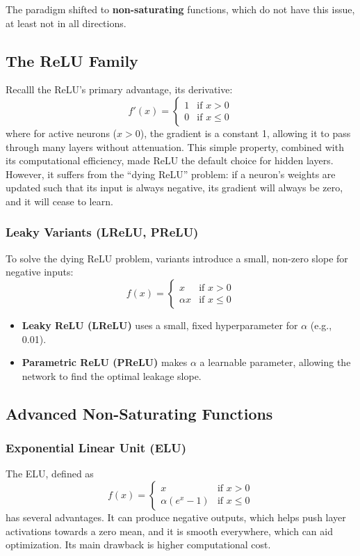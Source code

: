 \documentclass{article}
\begin{document}
The paradigm shifted to \textbf{non-saturating} functions, which do not have this issue, at least not in all directions.

\subsection{The ReLU Family}
Recalll the ReLU's primary advantage, its derivative:
\begin{equation}
f'(x) = 
\begin{cases} 
1 & \text{if } x > 0 \\
0 & \text{if } x \leq 0 
\end{cases}
\end{equation}
where for active neurons ($x>0$), the gradient is a constant 1, allowing it to pass through many layers without attenuation. This simple property, combined with its computational efficiency, made ReLU the default choice for hidden layers. However, it suffers from the ``dying ReLU'' problem: if a neuron's weights are updated such that its input is always negative, its gradient will always be zero, and it will cease to learn.

\subsubsection{Leaky Variants (LReLU, PReLU)}
To solve the dying ReLU problem, variants introduce a small, non-zero slope for negative inputs:
\begin{equation}
f(x) = 
\begin{cases} 
x & \text{if } x > 0 \\
\alpha x & \text{if } x \leq 0 
\end{cases}
\end{equation}
\begin{itemize}
    \item \textbf{Leaky ReLU (LReLU)} uses a small, fixed hyperparameter for $\alpha$ (e.g., 0.01).
    \item \textbf{Parametric ReLU (PReLU)} makes $\alpha$ a learnable parameter, allowing the network to find the optimal leakage slope.
\end{itemize}

\subsection{Advanced Non-Saturating Functions}
\subsubsection{Exponential Linear Unit (ELU)}
The ELU, defined as 
\begin{equation}
f(x) = \begin{cases} 
x & \text{if } x > 0 \\ 
\alpha(e^x - 1) & \text{if } x \leq 0 
\end{cases}
\end{equation}
has several advantages. It can produce negative outputs, which helps push layer activations towards a zero mean, and it is smooth everywhere, which can aid optimization. Its main drawback is higher computational cost.
\end{document}
